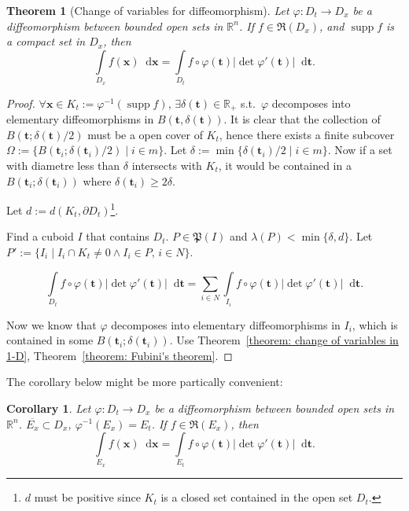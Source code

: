 \documentclass[openany]{book}
\theoremstyle{plain}
\newtheorem{theorem}{Theorem}[section] %
\newtheorem{corollary}{Corollary} %
\theoremstyle{definition}
\newcommand{\dif}{\mathop{}\!\mathrm{d}} %
\newcommand*{\bv}{\boldsymbol} %
\DeclareMathOperator{\supp}{supp}
\begin{document}
\begin{theorem}[Change of variables for diffeomorphism]
	\label{theorem: change of variables for diffeomorphism}
	Let $\varphi \colon D_t \to D_x$ be a diffeomorphism between bounded open sets in $\mathbb R^n$.
	If $f \in \mathfrak R(D_x)$, and $\supp f$ is a compact set in $D_x$, then
	\begin{equation*}
		\int\limits_{D_x} f(\bv x) \dif \bv x = \int\limits_{D_t} f \circ \varphi(\bv t) |\det \varphi'(\bv t)|\dif \bv t.
	\end{equation*}
\end{theorem}
\begin{proof}
	$\forall \bv x \in K_t := \varphi^{-1}(\supp f)$, $\exists \delta(\bv t) \in \mathbb R_+$ s.t.\ $\varphi$ decomposes into elementary diffeomorphisms in $B(\bv t, \delta(\bv t))$. 
	It is clear that the collection of $B(\bv t; \delta(\bv t)/2)$ must be a open cover of $K_t$, hence there exists a finite subcover~$\varOmega := \{ B(\bv t_i; \delta(\bv t_i)/2) \mid i \in m\}$. 
	Let $\delta := \min \{\delta(\bv t_i)/2 \mid i \in m\}$. 
	Now if a set with diametre less than $\delta$ intersects with $K_t$, it would be contained in a $B(\bv t_i; \delta(\bv t_i))$ where $\delta(\bv t_i) \geq 2 \delta$.
	
	Let $d := d(K_t, \partial D_t)$\footnote{$d$ must be positive since $K_t$ is a closed set contained in the open set $D_t$.}. 

	Find a cuboid $I$ that contains $D_t$. 
	$P \in \mathfrak P(I)$ and $\lambda(P) < \min \{\delta, d\}$. 
	Let $P' := \{I_i \mid I_i \cap K_t \neq 0 \wedge I_i \in P, \, i \in N\}$. 
	
	\begin{equation*}
		\int\limits_{D_t}  f \circ \varphi(\bv t) |\det \varphi'(\bv t)|\dif \bv t
			= \sum_{i \in N} \int\limits_{I_i} f \circ \varphi(\bv t) |\det \varphi'(\bv t)|\dif \bv t.
	\end{equation*}

	Now we know that $\varphi$ decomposes into elementary diffeomorphisms in $I_i$, which is contained in some $B(\bv t_i; \delta(\bv t_i))$. 
	Use Theorem~\ref{theorem: change of variables in 1-D}, Theorem~\ref{theorem: Fubini's theorem}.
\end{proof}

The corollary below might be more partically convenient:

\begin{corollary}
	\label{corollary: change of variables in a subset}
	Let $\varphi \colon D_t \to D_x$ be a diffeomorphism between bounded open sets in $\mathbb R^n$. 
	$\overline{E_x} \subset D_x$, $\varphi^{-1}(E_x) = E_t$. 
	If $f \in \mathfrak R(E_x)$, then
	\begin{equation*}
		\int\limits_{E_x} f(\bv x) \dif \bv x = \int\limits_{E_t} f \circ \varphi(\bv t) |\det \varphi'(\bv t)|\dif \bv t.
	\end{equation*}
\end{corollary}
\end{document}
